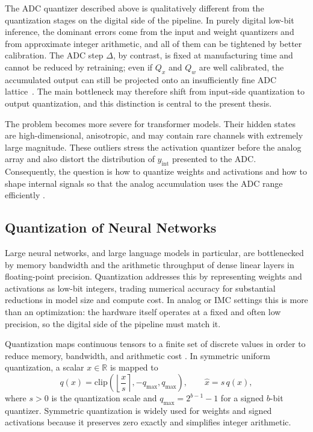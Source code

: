 \documentclass[a4paper,11pt,oneside]{article}
\theoremstyle{breakstyle}
\begin{document}
The ADC quantizer described above is qualitatively different from the
quantization stages on the digital side of the pipeline. In purely
digital low-bit inference, the dominant errors come from the input
and weight quantizers and from approximate integer arithmetic, and
all of them can be tightened by better calibration. The ADC step
$\Delta$, by contrast, is fixed at manufacturing time and cannot be
reduced by retraining; even if $Q_x$ and $Q_w$ are well calibrated,
the accumulated output can still be projected onto an insufficiently
fine ADC lattice~\cite{RAOQ2024,Buechel2025AnalogFoundation}. The
main bottleneck may therefore shift from input-side quantization to
output quantization, and this distinction is central to the present
thesis.

The problem becomes more severe for transformer models. Their hidden
states are high-dimensional, anisotropic, and may contain rare channels
with extremely large magnitude. These outliers stress the activation
quantizer before the analog array and also distort the distribution of
$y_{\mathrm{int}}$ presented to the ADC. Consequently, the question is
how to quantize weights and activations and how to shape
internal signals so that the analog accumulation uses the ADC range
efficiently \cite{RAOQ2024,Buechel2025AnalogFoundation}.

\subsection{Quantization of Neural Networks}
\label{subsec:quantization_basics}

Large neural networks, and large language models in particular, are
bottlenecked by memory bandwidth and the arithmetic throughput of dense
linear layers in floating-point precision. Quantization addresses this
by representing weights and activations as low-bit integers, trading
numerical accuracy for substantial reductions in model size and compute
cost. In analog or IMC settings this is more than an optimization: the
hardware itself operates at a fixed and often low precision, so the
digital side of the pipeline must match it.

Quantization maps continuous tensors to a finite set of discrete values
in order to reduce memory, bandwidth, and arithmetic cost
\cite{Jacob2018IntegerOnly,Wu2020IntegerQuant,Gholami2021Survey}. In
symmetric uniform quantization, a scalar $x \in \mathbb{R}$ is mapped to
\begin{equation}
q(x)
=
\mathrm{clip}
\!\left(
\left\lfloor \frac{x}{s} \right\rceil,
-q_{\max}, q_{\max}
\right),
\qquad
\hat{x} = s\,q(x),
\label{eq:symmetric_quant_background}
\end{equation}
where $s>0$ is the quantization scale and $q_{\max}=2^{b-1}-1$ for a
signed $b$-bit quantizer. Symmetric quantization is widely used for
weights and signed activations because it preserves zero exactly and
simplifies integer arithmetic.
\end{document}
